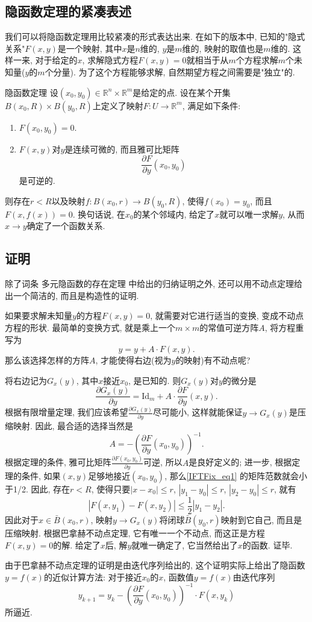 

\subsection{隐函数定理的紧凑表述}
我们可以将隐函数定理用比较紧凑的形式表达出来. 在如下的版本中, 已知的"隐式关系"$F(x,y)$是一个映射, 其中$x$是$n$维的, $y$是$m$维的, 映射的取值也是$m$维的. 这样一来, 对于给定的$x$, 求解隐式方程$F(x,y)=0$就相当于从$m$个方程求解$m$个未知量($y$的$m$个分量). 为了这个方程能够求解, 自然期望方程之间需要是"独立"的.
\begin{theorem}{隐函数定理}
设$(x_0,y_0)\in\mathbb{R}^n\times\mathbb{R}^m$是给定的点. 设在某个开集$B(x_0,R)\times B(y_0,R)$上定义了映射$F:U\to\mathbb{R}^m$, 满足如下条件:
\begin{enumerate}
\item $F(x_0,y_0)=0$.
\item $F(x,y)$对$y$是连续可微的, 而且雅可比矩阵
$$
\frac{\partial F}{\partial y}(x_0,y_0)
$$
是可逆的.
\end{enumerate}
则存在$r<R$以及映射$f:B(x_0,r)\to B(y_0,R)$, 使得$f(x_0)=y_0$, 而且$F(x,f(x))=0$. 换句话说, 在$x_0$的某个邻域内, 给定了$x$就可以唯一求解$y$, 从而$x\to y$确定了一个函数关系.
\end{theorem}

\subsection{证明}
除了词条 多元隐函数的存在定理 中给出的归纳证明之外, 还可以用不动点定理给出一个简洁的, 而且是构造性的证明.

如果要求解未知量$y$的方程$F(x,y)=0$, 就需要对它进行适当的变换, 变成不动点方程的形状. 最简单的变换方式, 就是乘上一个$m\times m$的常值可逆方阵$A$, 将方程重写为
$$
y=y+A\cdot F(x,y).
$$
那么该选择怎样的方阵$A$, 才能使得右边(视为$y$的映射)有不动点呢?

将右边记为$G_x(y)$, 其中$x$接近$x_0$, 是已知的. 则$G_x(y)$对$y$的微分是
\begin{equation}\label{IFTFix_eq1}
\frac{\partial G_x(y)}{\partial y}=\mathrm{Id}_m+A\cdot\frac{\partial F}{\partial y}(x,y).
\end{equation}
根据有限增量定理, 我们应该希望$\frac{\partial G_x(y)}{\partial y}$尽可能小, 这样就能保证$y\to G_x(y)$是压缩映射. 因此, 最合适的选择当然是
$$
A=-\left(\frac{\partial F}{\partial y}(x_0,y_0)\right)^{-1}.
$$
根据定理的条件, 雅可比矩阵$\frac{\partial F(x_0,y_0)}{\partial y}$可逆, 所以$A$是良好定义的; 进一步, 根据定理的条件, 如果$(x,y)$足够地接近$(x_0,y_0)$, 那么\autoref{IFTFix_eq1} 的矩阵范数就会小于1/2. 因此, 存在$r<R$, 使得只要$|x-x_0|\leq r$, $|y_1-y_0|\leq r$, $|y_2-y_0|\leq r$, 就有
$$
|F(x,y_1)-F(x,y_2)|\leq\frac{1}{2}|y_1-y_2|.
$$  
因此对于$x\in \bar B(x_0,r)$, 映射$y\to G_x(y)$将闭球$\bar B(y_0,r)$映射到它自己, 而且是压缩映射. 根据巴拿赫不动点定理, 它有唯一一个不动点, 而这正是方程$F(x,y)=0$的解. 给定了$x$后, 解$y$就唯一确定了, 它当然给出了$x$的函数. 证毕.

由于巴拿赫不动点定理的证明是由迭代序列给出的, 这个证明实际上给出了隐函数$y=f(x)$的近似计算方法: 对于接近$x_0$的$x$, 函数值$y=f(x)$由迭代序列
$$
y_{k+1}=y_k-\left(\frac{\partial F}{\partial y}(x_0,y_0)\right)^{-1}\cdot F(x,y_k)
$$
所逼近.